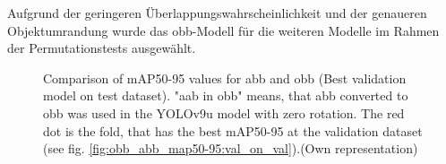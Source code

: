 Aufgrund der geringeren Überlappungswahrscheinlichkeit und der genaueren Objektumrandung wurde das \acrshort{obb}-Modell für die weiteren Modelle im Rahmen der Permutationstests ausgewählt.

\begin{figure}[htbp]
    \centering
    
    \caption[Comparison of \acrshort{mAP}50-95 values for \acrshort{abb} and \acrshort{obb} (Best validation model on test dataset)]{Comparison of \acrshort{mAP}50-95 values for \acrshort{abb} and \acrshort{obb} (Best validation model on test dataset). "aab in obb" means, that \acrlong{abb} converted to obb was used in the \acrshort{YOLO}v9u model with zero rotation. The red dot is the fold, that has the best \acrshort{mAP}50-95 at the validation dataset (see fig. \ref{fig:obb_abb_map50-95:val_on_val}).(Own representation)}
    \label{fig:obb_abb_map50-95:val_on_test}
\end{figure}



